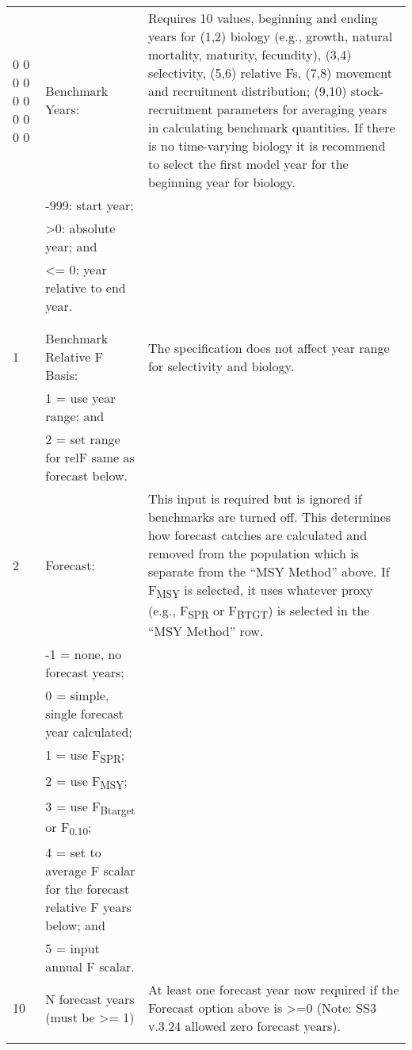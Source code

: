 \begin{landscape}
{\begin{longtable}{p{3.2cm} p{7cm} p{10.8cm}}
    
  \hline
  0 0 0 0 0 0 0 0 0 0 & Benchmark Years: & \multirow{1}{1cm}[-0.15cm]{\parbox{11cm}{Requires 10 values, beginning and ending years for (1,2) biology (e.g., growth, natural mortality, maturity, fecundity), (3,4) selectivity, (5,6) relative Fs, (7,8) movement and recruitment distribution; (9,10) stock-recruitment parameters for averaging years in calculating benchmark quantities. If there is no time-varying biology it is recommend to select the first model year for the beginning year for biology.}} \Tstrut\\
    & -999: start year; & \\
    & >0: absolute year; and & \\
    & <= 0: year relative to end year. & \\
    & & \\
    & & \\

  \pagebreak
  1 & Benchmark Relative F Basis: & \multirow{1}{1cm}[-0.2cm]{\parbox{11cm}{The specification does not affect year range for selectivity and biology.}} \Tstrut\\
    & 1 = use year range; and & \\
    & 2 = set range for relF same as forecast below. & \\

  \hline
  2 & Forecast: & \multirow{1}{1cm}[-0.25cm]{\parbox{11cm}{This input is required but is ignored if benchmarks are turned off. This determines how forecast catches are calculated and removed from the population which is separate from the ``MSY Method'' above. If F\textsubscript{MSY} is selected, it uses whatever proxy (e.g., F\textsubscript{SPR} or F\textsubscript{BTGT}) is selected in the ``MSY Method'' row.}} \Tstrut\\
    & -1 = none, no forecast years; & \\
    & 0 = simple, single forecast year calculated; & \\
    & 1 = use F\textsubscript{SPR}; & \\
    & 2 = use F\textsubscript{MSY}; & \\
    & 3 = use F\textsubscript{Btarget} or F\textsubscript{0.10}; & \\
    & 4 = set to average F scalar for the forecast relative F years below; and & \\
    & 5 = input annual F scalar. & \Bstrut\\

  \hline
  10 & N forecast years (must be >= 1) & \multirow{1}{1cm}[-0.15cm]{\parbox{11cm}{At least one forecast year now required if the Forecast option above is >=0 (Note: SS3 v.3.24 allowed zero forecast years).}} \Tstrut\\
    & & \Bstrut\\


\end{longtable}}
\end{landscape}
